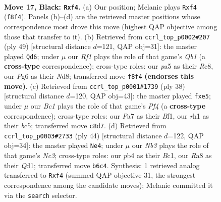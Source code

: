 \documentclass[11pt]{article}
\begin{document}
\begin{figure}[p]
\label{fig:thought-m31}
\end{figure}

\clearpage

\begin{figure}[p]\centering
\begin{subfigure}{0.46\textwidth}\centering
\resizebox{\linewidth}{!}{%
\newchessgame
\chessboard[
  setfen={rnb2rk1/ppp5/1n2p1p1/P2pP3/1P1P1Pp1/1PN5/8/3QKBNR b K - 0 17},
  showmover=false,
  pgfstyle=straightmove, color=movearrow, markmove={f8-f4}
]}
\caption{}
\end{subfigure}\hfill
\begin{subfigure}{0.46\textwidth}\centering
\resizebox{\linewidth}{!}{%
\newchessgame
\chessboard[
  setfen={1qrnk2r/p3n2p/4pp2/1PN2p2/N2P1P2/PQ2p1P1/6BP/5RK1 b k - 0 25},
  showmover=false,
  pgfstyle=straightmove, color=movearrow, markmove={b8-d6}
]}
\caption{}
\end{subfigure}
\\[4pt]
\begin{subfigure}{0.46\textwidth}\centering
\resizebox{\linewidth}{!}{%
\newchessgame
\chessboard[
  setfen={r1k5/1p1n4/2p1b1pB/p1bNp3/P1P1PP2/6P1/1P6/R3KB2 w Q - 0 20},
  showmover=false,
  pgfstyle=straightmove, color=movearrow, markmove={f4-e5}
]}
\caption{}
\end{subfigure}\hfill
\begin{subfigure}{0.46\textwidth}\centering
\resizebox{\linewidth}{!}{%
\newchessgame
\chessboard[
  setfen={r1nqr1k1/1p1n1pbp/p2p2p1/P2P1P2/8/R1NB4/1P3P1P/2BQ2RK w - - 1 23},
  showmover=false,
  pgfstyle=straightmove, color=movearrow, markmove={c3-e4}
]}
\caption{}
\end{subfigure}
\caption{\textbf{Move 17, Black: \texttt{Rxf4}.} (a) Our position; Melanie plays \texttt{Rxf4} (\texttt{f8f4}). Panels (b)--(d) are the retrieved master positions whose correspondence most drove this move (highest QAP objective among those that transfer to it). (b) Retrieved from \texttt{ccrl\_top\_p0002\#207} (ply 49) [structural distance $d$=121, QAP obj=31]: the master played \texttt{Qd6}; under $\mu$ our \emph{Rf1} plays the role of that game's \emph{Qb1} (a \textbf{cross-type} correspondence); cross-type roles: our \emph{p}a5 as their \emph{R}c8, our \emph{P}g6 as their \emph{N}d8; transferred move \texttt{f8f4} \textbf{(endorses this move)}. (c) Retrieved from \texttt{ccrl\_top\_p0001\#1739} (ply 38) [structural distance $d$=120, QAP obj=43]: the master played \texttt{fxe5}; under $\mu$ our \emph{Bc1} plays the role of that game's \emph{Pf4} (a \textbf{cross-type} correspondence); cross-type roles: our \emph{P}a7 as their \emph{B}f1, our \emph{r}h1 as their \emph{b}c5; transferred move \texttt{c8d7}. (d) Retrieved from \texttt{ccrl\_top\_p0003\#2733} (ply 44) [structural distance $d$=122, QAP obj=34]: the master played \texttt{Ne4}; under $\mu$ our \emph{Nb3} plays the role of that game's \emph{Nc3}; cross-type roles: our \emph{p}b4 as their \emph{B}c1, our \emph{R}a8 as their \emph{Q}d1; transferred move \texttt{b6c4}. Synthesis: 1 retrieved analog transferred to \texttt{Rxf4} (summed QAP objective 31, the strongest correspondence among the candidate moves); Melanie committed it via the \texttt{search} selector.}

\end{figure}
\end{document}
